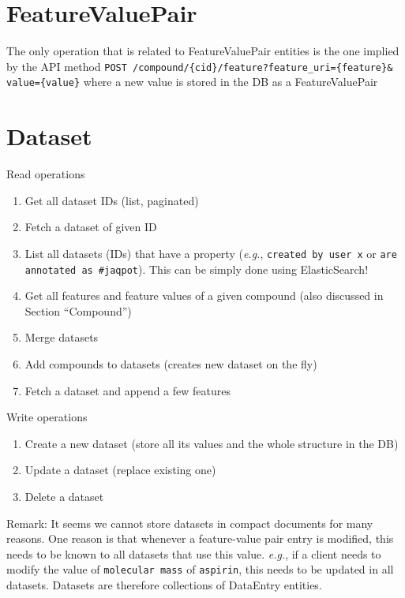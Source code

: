 \section{FeatureValuePair}

The only operation that is related to FeatureValuePair entities is the one implied by the API method 
\texttt{POST /compound/\{cid\}/feature?feature\_uri=\{feature\}\& value=\{value\}} where a new value is stored in the DB as a FeatureValuePair

\section{Dataset}

\noindent Read operations
\begin{enumerate}
 \item Get all dataset IDs (list, paginated)
\item  Fetch a dataset of given ID
\item  List all datasets (IDs) that have a property (\textit{e.g.}, 
   \texttt{created by user x} or \texttt{are annotated as \#jaqpot}). This can be simply done using ElasticSearch!
\item  Get all features and feature values of a given compound (also discussed in Section “Compound”)
\item  Merge datasets
\item  Add compounds to datasets (creates new dataset on the fly)
\item  Fetch a dataset and append a few features
\end{enumerate}


\noindent Write operations
\begin{enumerate}
\item  Create a new dataset (store all its values and the whole structure in the DB)
\item  Update a dataset (replace existing one)
\item Delete a dataset
\end{enumerate}

\noindent Remark: It seems we cannot store datasets in compact documents for many reasons. 
One reason is that whenever a feature-value pair entry is modified, this needs to be known to 
all datasets that use this value. \textit{e.g.}, if a client needs to modify the value of \texttt{molecular mass}
of \texttt{aspirin}, this needs to be updated in all datasets. 
Datasets are therefore collections of DataEntry entities.




